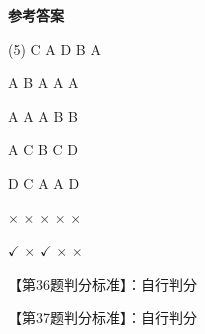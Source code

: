 \documentclass[11pt, a4paper]{article}
\begin{document}
\begin{center}
    \Huge \textbf{参考答案}
\end{center}

    \begin{tasks}[label=\arabic*. , label-width=14pt](5)
        \task C
        \task A
        \task D
        \task B
        \task A

        \task A
        \task B
        \task A
        \task A
        \task A

        \task A
        \task A
        \task A
        \task B
        \task B

        \task A
        \task C
        \task B
        \task C
        \task D

        \task D
        \task C
        \task A
        \task A
        \task D

        \task $\times$
        \task $\times$
        \task $\times$
        \task $\times$
        \task $\times$

        \task $\checkmark$
        \task $\times$
        \task $\checkmark$
        \task $\times$
        \task $\times$
    \end{tasks}

    【第36题判分标准】：自行判分

    【第37题判分标准】：自行判分
\end{document}
